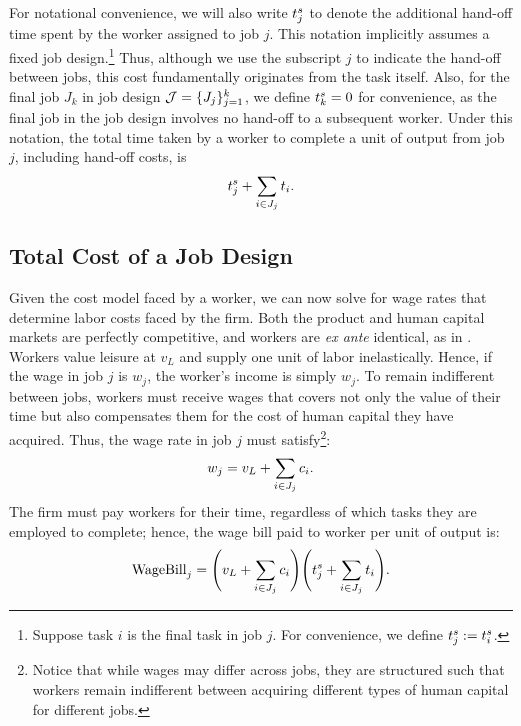 \documentclass{article}
\theoremstyle{plain}
\theoremstyle{plain}
\begin{document}
For notational convenience, we will also write $t^{s}_{j}$ to denote the additional hand-off time spent by the worker assigned to job $j$.  This notation implicitly assumes a fixed job design.\footnote{
Suppose task $i$ is the final task in job $j$.
For convenience, we define $t^{s}_{j} := t^{s}_{i}$.}
Thus, although we use the subscript $j$ to indicate the hand-off between jobs, this cost fundamentally originates from the task itself. Also, for the final job $J_k$ in job design $\mathcal{J} = \{J_j\}_{j=1}^k$, we define $t^{s}_{k} = 0$ for convenience, as the final job in the job design involves no hand-off to a subsequent worker.  Under this notation, the total time taken by a worker to complete a unit of output from job $j$, including hand-off costs, is
\[ t^{s}_{j} + \sum_{i \in J_j} t_{i}. \]

\subsection{Total Cost of a Job Design}

Given the cost model faced by a worker, we can now solve for wage rates that determine labor costs faced by the firm. Both the product and human capital markets are perfectly competitive, and workers are \emph{ex ante} identical, as in \cite{becker1992division}.
Workers value leisure at $v_L$ and supply one unit of labor inelastically.
Hence, if the wage in job $j$ is $w_j$, the worker's income is simply $w_j$.
To remain indifferent between jobs, workers must receive wages that covers not only the value of their time but also compensates them for the cost of human capital they have acquired.
Thus, the wage rate in job $j$ must satisfy\footnote{Notice that while wages may differ across jobs, they are structured such that workers remain indifferent between acquiring different types of human capital for different jobs.}:
\begin{align}
\label{eq:wage}
w_j = v_L + \sum_{i \in J_j} c_{i}.
\end{align}
The firm must pay workers for their time, regardless of which tasks they are employed to complete; hence, the wage bill paid to worker per unit of output is:
\begin{align}
\label{eq:wagebill}
\text{WageBill}_j = \Biggl(v_L + \sum_{i \in J_j} c_{i} \Biggr) \Biggl(t^{s}_{j} + \sum_{i \in J_j} t_{i} \Biggr).
\end{align}
\end{document}
